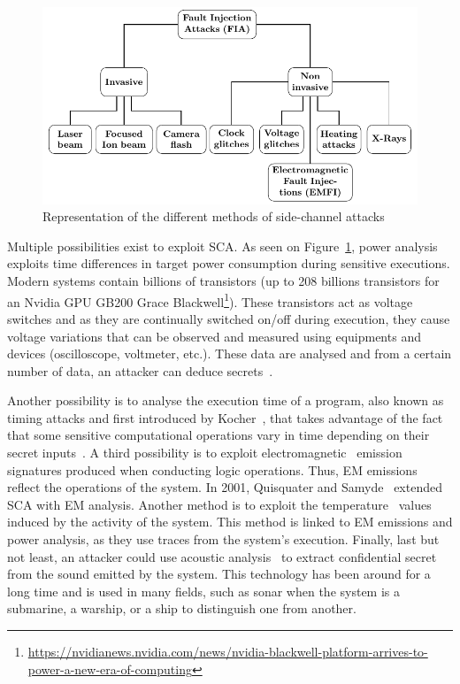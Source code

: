 \begin{figure}[ht]
    \centering
    \includegraphics[page=3, width=.75\textwidth]{c2_soa/img/physicalAttacks.pdf}
    \caption{Representation of the different methods of side-channel attacks}
    \label{fig:sca}
\end{figure}

Multiple possibilities exist to exploit SCA.
As seen on Figure~\ref{fig:sca}, power analysis exploits time differences in target power consumption during sensitive executions. Modern systems contain billions of transistors (up to 208 billions transistors for an Nvidia GPU GB200 Grace Blackwell\footnote{\hfill\url{https://nvidianews.nvidia.com/news/nvidia-blackwell-platform-arrives-to-power-a-new-era-of-computing}}).
These transistors act as voltage switches and as they are continually switched on/off during execution, they cause voltage variations that can be observed and measured using equipments and devices (oscilloscope, voltmeter, etc.). These data are analysed and from a certain number of data, an attacker can deduce secrets~\cite{KJJ-98-crypto,KJJR-11-jce,GP-99-ches,LKOSECG-21-sp}.

Another possibility is to analyse the execution time of a program, also known as timing attacks and first introduced by Kocher~\cite{K-96-crypto}, that takes advantage of the fact that some sensitive computational operations vary in time depending on their secret inputs~\cite{DD-05-compnet}.
A third possibility is to exploit electromagnetic~\cite{ANM-19-di,HMHSS-12-tcrypo,KSTO-17-iccad, WDL-16-ntms,HGTVJ-22-dt} emission signatures produced when conducting logic operations. Thus, EM emissions reflect the operations of the system. In 2001, Quisquater and Samyde~\cite{QS-01-scps} extended SCA with EM analysis.
Another method is to exploit the temperature~\cite{HS-14-cardis,AZRHT-21-tvlsi} values induced by the activity of the system. This method is linked to EM emissions and power analysis, as they use traces from the system's execution.
Finally, last but not least, an attacker could use acoustic analysis~\cite{BDGPS-10-usenix,GST-17-crypto,HTM-23-eurospw} to extract confidential secret from the sound emitted by the system. This technology has been around for a long time and is used in many fields, such as sonar when the system is a submarine, a warship, or a ship to distinguish one from another.


